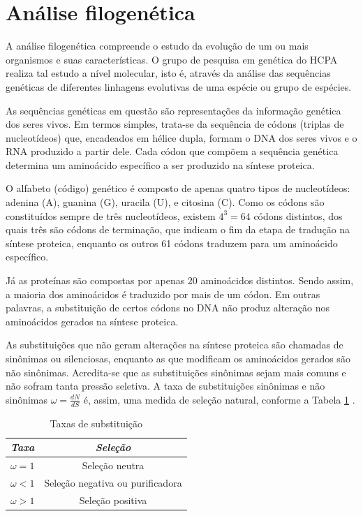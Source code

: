 \documentclass[cic,tc]{iiufrgs}
\begin{document}
\section{Análise filogenética}
\label{sec:filo}

A análise filogenética compreende o estudo da evolução de um ou mais organismos
e suas características. O grupo de pesquisa em genética do HCPA realiza tal
estudo a nível molecular, isto é, através da análise das sequências genéticas
de diferentes linhagens evolutivas de uma espécie ou grupo de espécies.

As sequências genéticas em questão são representações da informação genética
dos seres vivos. Em termos simples, trata-se da sequência de códons (triplas de
nucleotídeos) que, encadeados em hélice dupla, formam o DNA dos seres vivos e o
RNA produzido a partir dele. Cada códon que compõem a sequência genética
determina um aminoácido específico a ser produzido na síntese proteica.

O alfabeto (código) genético é composto de apenas quatro tipos de nucleotídeos:
adenina (A), guanina (G), uracila (U), e citosina (C). Como os códons são
constituídos sempre de três nucleotídeos, existem $4^3 = 64$ códons distintos,
dos quais três são códons de terminação, que indicam o fim da etapa de tradução
na síntese proteica, enquanto os outros 61 códons traduzem para um aminoácido
específico.

Já as proteínas são compostas por apenas 20 aminoácidos distintos. Sendo assim,
a maioria dos aminoácidos é traduzido por mais de um códon. Em outras palavras,
a substituição de certos códons no DNA não produz alteração nos aminoácidos
gerados na síntese proteica.

As substituições que não geram alterações na síntese proteica são chamadas de
sinônimas ou silenciosas, enquanto as que modificam os aminoácidos gerados são
não sinônimas. Acredita-se que as substituições sinônimas sejam mais comuns e
não sofram tanta pressão seletiva. A taxa de substituições sinônimas e não
sinônimas $\omega = \frac{dN}{dS}$ é, assim, uma medida de seleção natural,
conforme a Tabela \ref{tbl:ex1} \cite{yang2002codon}.

\begin{table}[h]
    \caption{Taxas de substituição}
    \centering
        \begin{tabular}{c|c}
          \hline
          \textit{Taxa}  &   \textit{Seleção} \\
          \hline
          \hline
          $\omega = 1$ & Seleção neutra \\
          $\omega < 1$ & Seleção negativa ou purificadora \\
          $\omega > 1$ & Seleção positiva \\
          \hline
        \end{tabular}
    \label{tbl:ex1}
\end{table}
\end{document}
